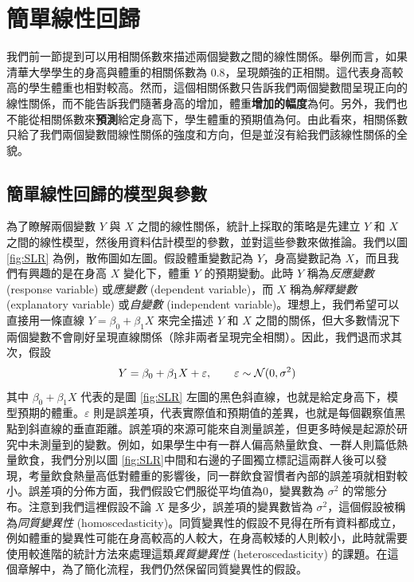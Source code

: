 \section{簡單線性回歸}

    我們前一節提到可以用相關係數來描述兩個變數之間的線性關係。舉例而言，如果清華大學學生的身高與體重的相關係數為 0.8，呈現頗強的正相關。這代表身高較高的學生體重也相對較高。然而，這個相關係數只告訴我們兩個變數間呈現正向的線性關係，而不能告訴我們隨著身高的增加，體重\textbf{增加的幅度}為何。另外，我們也不能從相關係數來\textbf{預測}給定身高下，學生體重的預期值為何。由此看來，相關係數只給了我們兩個變數間線性關係的強度和方向，但是並沒有給我們該線性關係的全貌。

    \subsection{簡單線性回歸的模型與參數}
    
    為了瞭解兩個變數 $Y$ 與 $X$ 之間的線性關係，統計上採取的策略是先建立 $Y$ 和 $X$ 之間的線性模型，然後用資料估計模型的參數，並對這些參數來做推論。我們以圖 \ref{fig:SLR} 為例，散佈圖如左圖。假設體重變數記為 $Y$，身高變數記為 $X$，而且我們有興趣的是在身高 $X$ 變化下，體重 $Y$ 的預期變動。此時 $Y$ 稱為\textit{反應變數} (response variable) 或\textit{應變數} (dependent variable)，而 $X$ 稱為\textit{解釋變數} (explanatory variable) 或\textit{自變數} (independent variable)。理想上，我們希望可以直接用一條直線 $Y = \beta_0 + \beta_1 X$ 來完全描述 $Y$ 和 $X$ 之間的關係，但大多數情況下兩個變數不會剛好呈現直線關係（除非兩者呈現完全相關）。因此，我們退而求其次，假設
    \[Y = \beta_0 + \beta_1 X + \varepsilon, \qquad \varepsilon \sim \mathcal{N}(0, \sigma^2)\]
    其中 $\beta_0 + \beta_1 X$ 代表的是圖 \ref{fig:SLR} 左圖的黑色斜直線，也就是給定身高下，模型預期的體重。$\varepsilon$ 則是誤差項，代表實際值和預期值的差異，也就是每個觀察值黑點到斜直線的垂直距離。誤差項的來源可能來自測量誤差，但更多時候是起源於研究中未測量到的變數。例如，如果學生中有一群人偏高熱量飲食、一群人則篇低熱量飲食，我們分別以圖 \ref{fig:SLR}中間和右邊的子圖獨立標記這兩群人後可以發現，考量飲食熱量高低對體重的影響後，同一群飲食習慣者內部的誤差項就相對較小。誤差項的分佈方面，我們假設它們服從平均值為$0$，變異數為 $\sigma^2$ 的常態分布。注意到我們這裡假設不論 $X$ 是多少，誤差項的變異數皆為 $\sigma^2$，這個假設被稱為\textit{同質變異性} (homoscedasticity)。同質變異性的假設不見得在所有資料都成立，例如體重的變異性可能在身高較高的人較大，在身高較矮的人則較小，此時就需要使用較進階的統計方法來處理這類\textit{異質變異性} (heteroscedasticity) 的課題。在這個章解中，為了簡化流程，我們仍然保留同質變異性的假設。

